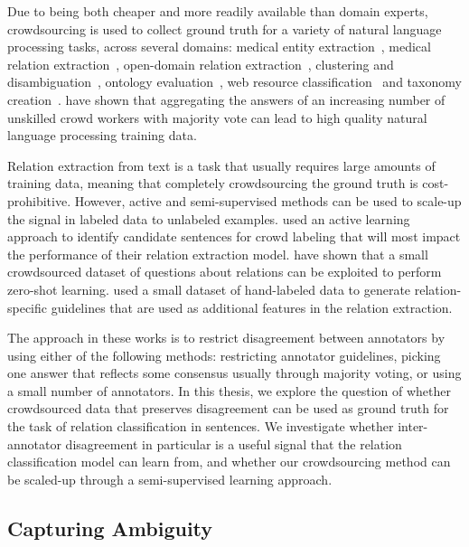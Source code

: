 Due to being both cheaper and more readily available than domain experts, crowdsourcing is used to collect ground truth for a variety of natural language processing tasks, across several domains: medical entity extraction~\cite{zhai2013web,Finin2010,van2012eu}, medical relation extraction~\cite{kilicoglu2011constructing,van2012eu}, open-domain relation extraction~\cite{kondreddi2014combining}, clustering and disambiguation~\cite{Lee2013}, ontology evaluation~\cite{noy2013mechanical}, web resource classification~\cite{castano2016human} and taxonomy creation~\cite{bragg2013crowdsourcing}. \citet{Snow2008} have shown that aggregating the answers of an increasing number of unskilled crowd workers with majority vote can lead to high quality natural language processing training data.

Relation extraction from text is a task that usually requires large amounts of training data, meaning that completely crowdsourcing the ground truth is cost-prohibitive. However, active and semi-supervised methods can be used to scale-up the signal in labeled data to unlabeled examples. \citet{angeli2014combining} used an active learning approach to identify candidate sentences for crowd labeling that will most impact the performance of their relation extraction model. \citet{levy2017zero} have shown that a small crowdsourced dataset of questions about relations can be exploited to perform zero-shot learning. \citet{pershina2014infusion} used a small dataset of hand-labeled data to generate relation-specific guidelines that are used as additional features in the relation extraction.

The approach in these works is to restrict disagreement between annotators by using either of the following methods: restricting annotator guidelines, picking one answer that reflects some consensus usually through majority voting, or using a small number of annotators. In this thesis, we explore the question of whether crowdsourced data that preserves disagreement can be used as ground truth for the task of relation classification in sentences. We investigate whether inter-annotator disagreement in particular is a useful signal that the relation classification model can learn from, and whether our crowdsourcing method can be scaled-up through a semi-supervised learning approach.


\subsection{Capturing Ambiguity}

